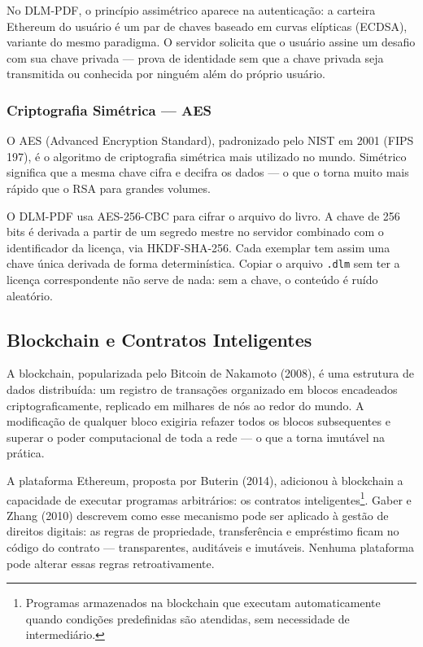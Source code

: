 \documentclass[12pt]{article}
\begin{document}
No DLM-PDF, o princípio assimétrico aparece na autenticação: a carteira Ethereum do usuário é um par de chaves baseado em curvas elípticas (ECDSA), variante do mesmo paradigma. O servidor solicita que o usuário assine um desafio com sua chave privada — prova de identidade sem que a chave privada seja transmitida ou conhecida por ninguém além do próprio usuário.

\subsubsection*{Criptografia Simétrica — AES}

O AES (Advanced Encryption Standard), padronizado pelo NIST em 2001 (FIPS 197), é o algoritmo de criptografia simétrica mais utilizado no mundo. Simétrico significa que a mesma chave cifra e decifra os dados — o que o torna muito mais rápido que o RSA para grandes volumes.

O DLM-PDF usa AES-256-CBC para cifrar o arquivo do livro. A chave de 256 bits é derivada a partir de um segredo mestre no servidor combinado com o identificador da licença, via HKDF-SHA-256. Cada exemplar tem assim uma chave única derivada de forma determinística. Copiar o arquivo \texttt{.dlm} sem ter a licença correspondente não serve de nada: sem a chave, o conteúdo é ruído aleatório.

\subsection{Blockchain e Contratos Inteligentes}

A blockchain, popularizada pelo Bitcoin de Nakamoto (2008), é uma estrutura de dados distribuída: um registro de transações organizado em blocos encadeados criptograficamente, replicado em milhares de nós ao redor do mundo. A modificação de qualquer bloco exigiria refazer todos os blocos subsequentes e superar o poder computacional de toda a rede — o que a torna imutável na prática.

A plataforma Ethereum, proposta por Buterin (2014), adicionou à blockchain a capacidade de executar programas arbitrários: os contratos inteligentes\footnote{Programas armazenados na blockchain que executam automaticamente quando condições predefinidas são atendidas, sem necessidade de intermediário.}. Gaber e Zhang (2010) descrevem como esse mecanismo pode ser aplicado à gestão de direitos digitais: as regras de propriedade, transferência e empréstimo ficam no código do contrato — transparentes, auditáveis e imutáveis. Nenhuma plataforma pode alterar essas regras retroativamente.
\end{document}
